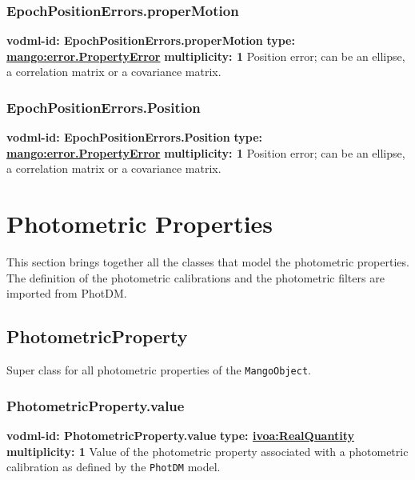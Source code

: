     \subsubsection{EpochPositionErrors.properMotion}
    \textbf{vodml-id: EpochPositionErrors.properMotion} \newline
    \textbf{type: \hyperref[sect:error.PropertyError]{mango:error.PropertyError}} \newline
    \textbf{multiplicity: 1} \newline
    Position error; can be an ellipse, a correlation matrix or a covariance matrix.

    \subsubsection{EpochPositionErrors.Position}
    \textbf{vodml-id: EpochPositionErrors.Position} \newline
    \textbf{type: \hyperref[sect:error.PropertyError]{mango:error.PropertyError}} \newline
    \textbf{multiplicity: 1} \newline
    Position error; can be an ellipse, a correlation matrix or a covariance matrix.

\section{Photometric Properties}
This section brings together all the classes that model the photometric properties.
The definition of the photometric calibrations and the 
photometric filters are imported from PhotDM. 
  \subsection{PhotometricProperty}
    \label{sect:PhotometricProperty}
    Super class for all photometric properties of the \texttt{MangoObject}.

    \subsubsection{PhotometricProperty.value}
    \textbf{vodml-id: PhotometricProperty.value} \newline
    \textbf{type: \hyperref[sect:ivoa]{ivoa:RealQuantity}} \newline
    \textbf{multiplicity: 1} \newline
    Value of the photometric property associated with a photometric calibration as defined by the \texttt{PhotDM} model.

